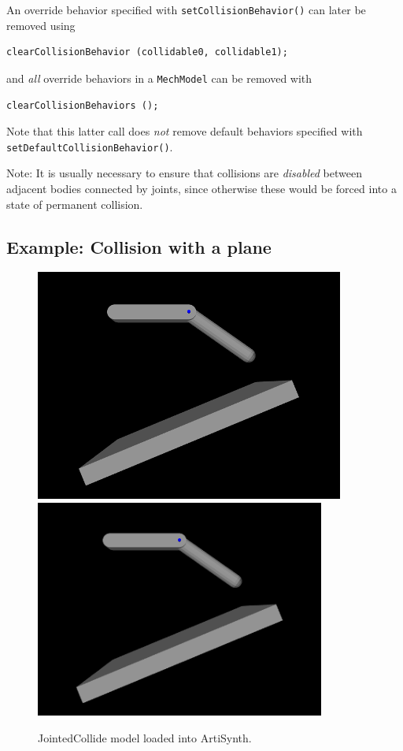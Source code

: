 An override behavior specified with
{\tt setCollisionBehavior()} can later be removed
using 
%
\begin{lstlisting}[]
  clearCollisionBehavior (collidable0, collidable1);
\end{lstlisting}
%
and {\it all} override behaviors in a {\tt MechModel} can
be removed with
%
\begin{lstlisting}[]
  clearCollisionBehaviors ();
\end{lstlisting}
%
Note that this latter call does {\it not} remove default behaviors
specified with {\tt setDefaultCollisionBehavior()}.

\begin{sideblock}
Note: It is usually necessary to ensure that collisions are {\it disabled}
between adjacent bodies connected by joints, since otherwise these
would be forced into a state of permanent collision.
\end{sideblock}

\subsection{Example: Collision with a plane}
\label{JointedCollide:sec}

\begin{figure}[ht]
\begin{center}
\iflatexml
 \includegraphics[]{images/JointedCollide}
\else
 \includegraphics[width=3.75in]{images/JointedCollide}
\fi
\end{center}
\caption{JointedCollide model loaded into ArtiSynth.}
\label{JointedCollide:fig}
\end{figure}

